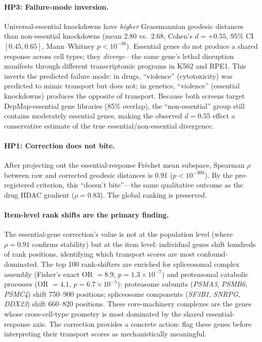 \documentclass{article}
\begin{document}
\paragraph{HP3: Failure-mode inversion.}
Universal-essential knockdowns have \emph{higher} Grassmannian geodesic
distances than non-essential knockdowns (mean 2.80 vs.\ 2.68, Cohen's $d =
+0.55$, 95\% CI $[0.45, 0.65]$, Mann--Whitney $p < 10^{-30}$). Essential
genes do not produce a shared response across cell types; they
\emph{diverge}---the same gene's lethal disruption manifests through
different transcriptomic programs in K562 and RPE1. This inverts the
predicted failure mode: in drugs, ``violence'' (cytotoxicity) was predicted
to mimic transport but does not; in genetics, ``violence'' (essential
knockdowns) produces the opposite of transport. Because both screens target
DepMap-essential gene libraries (85\% overlap), the ``non-essential'' group
still contains moderately essential genes, making the observed $d = 0.55$
effect a conservative estimate of the true essential/non-essential divergence.

\paragraph{HP1: Correction does not bite.}
After projecting out the essential-response Fr\'echet mean subspace,
Spearman $\rho$ between raw and corrected geodesic distances is 0.91 ($p <
10^{-300}$). By the pre-registered criterion, this ``doesn't bite''---the
same qualitative outcome as the drug HDAC gradient ($\rho = 0.83$).
The global ranking is preserved.

\paragraph{Item-level rank shifts are the primary finding.}
The essential-gene correction's value is not at the population level
(where $\rho = 0.91$ confirms stability) but at the item level: individual
genes shift hundreds of rank positions, identifying which transport scores
are most confound-dominated. The top 100 rank-shifters are enriched for
spliceosomal complex assembly (Fisher's exact OR $= 8.9$, $p = 1.3 \times
10^{-7}$) and proteasomal catabolic processes (OR $= 4.1$, $p = 6.7 \times
10^{-5}$): proteasome subunits (\emph{PSMA3}, \emph{PSMB6}, \emph{PSMC4})
shift 750--900 positions; spliceosome components (\emph{SF3B1},
\emph{SNRPG}, \emph{DDX23}) shift 660--820 positions. These core-machinery
complexes are the genes whose cross-cell-type geometry is most dominated by
the shared essential-response axis. The correction provides a concrete
action: flag these genes before interpreting their transport scores as
mechanistically meaningful.
\end{document}
